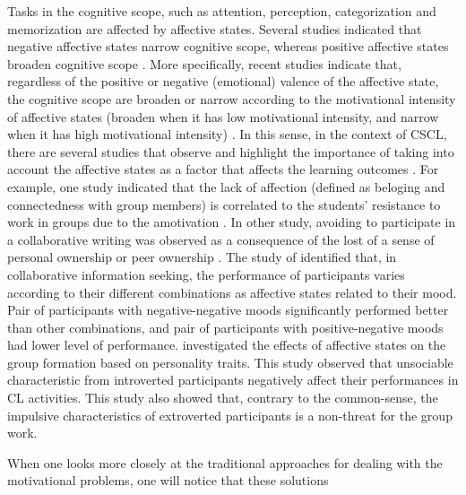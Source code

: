 Tasks in the cognitive scope, such as attention, perception, categorization and memorization are affected by affective states.
Several studies indicated that negative affective states narrow cognitive scope, whereas positive affective states broaden cognitive scope \cite{HicksFriedmanGableDavis2012,GableHarmon-Jones2008,Fredrickson2001,KimchiPalmer1982,Navon1977,Easterbrook1959}.
More specifically, recent studies indicate that, regardless of the positive or negative (emotional) valence of the affective state, the cognitive scope are broaden or narrow according to the motivational intensity of affective states (broaden when it has low motivational intensity, and narrow when it has high motivational intensity) \cite{Harmon-JonesGablePrice2012,DomachowskaHeitmannDeutschGoschkeScherbaumBolte2016,Harmon-JonesGablePrice2013}.
In this sense, in the context of CSCL, there are several studies that observe and highlight the importance of taking into account the affective states as a factor that affects the learning outcomes \cite{DaradoumisArguedasXhafa2013, ZhouChen2014,ReisRodriguezLyraJaquesBittencourtIsotani2015,ReisIsotaniRodriguezLyraJaquesBittencourt2018}.
For example, one study indicated that the lack of affection (defined as beloging and connectedness with group members) is correlated to the students' resistance to work in groups due to the amotivation \cite{SoBrush2008}. 
In other study, avoiding to participate in a collaborative writing was observed as a consequence of the lost of a sense of personal ownership or peer ownership \cite{CaspiBlau2011}.
The study of  identified that, in collaborative information seeking, the performance of participants varies according to their different combinations as affective states related to their mood.
Pair of participants with negative-negative moods significantly performed better than other combinations, and pair of participants with positive-negative moods had lower level of performance.
 investigated the effects of affective states on the group formation based on personality traits.
This study observed that unsociable characteristic from introverted participants negatively affect their performances in CL activities.
This study also showed that, contrary to the common-sense, the impulsive characteristics of extroverted participants is a non-threat for the group work.





When one looks more closely at the traditional approaches for dealing with the motivational problems, one will notice that these solutions 

